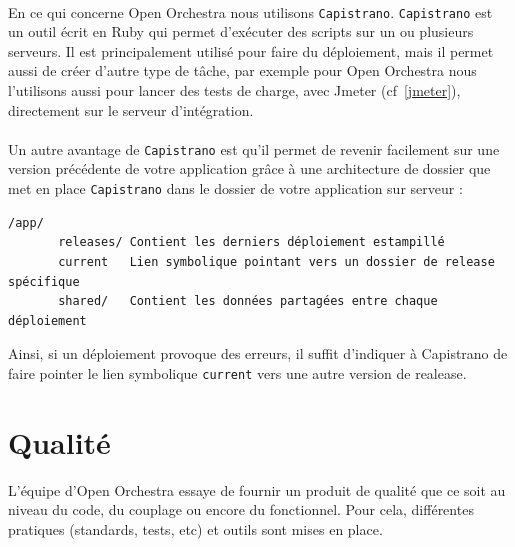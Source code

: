 \paragraph{}
En ce qui concerne Open Orchestra nous utilisons \verb?Capistrano?. \verb?Capistrano? est un outil écrit en Ruby qui permet d'exécuter des scripts sur un ou plusieurs serveurs. Il est principalement utilisé pour faire du déploiement, mais il permet aussi de créer d'autre type de tâche, par exemple pour Open Orchestra nous l'utilisons aussi pour lancer des tests de charge, avec Jmeter (cf~\ref{jmeter}), directement sur le serveur d'intégration.
\paragraph{}
Un autre avantage de \verb?Capistrano? est qu'il permet de revenir facilement sur une version précédente de votre application grâce à une architecture de dossier que met en place \verb?Capistrano? dans le dossier de votre application sur serveur : 
\begin{verbatim}
/app/
       releases/ Contient les derniers déploiement estampillé
       current   Lien symbolique pointant vers un dossier de release spécifique
       shared/   Contient les données partagées entre chaque déploiement
\end{verbatim}
Ainsi, si un déploiement provoque des erreurs, il suffit d'indiquer à Capistrano de faire pointer le lien symbolique \verb?current? vers une autre version de realease.

\section{Qualité}
L'équipe d'Open Orchestra essaye de fournir un produit de qualité que ce soit au niveau du code, du couplage ou encore du fonctionnel. Pour cela, différentes pratiques (standards, tests, etc) et outils sont mises en place.
